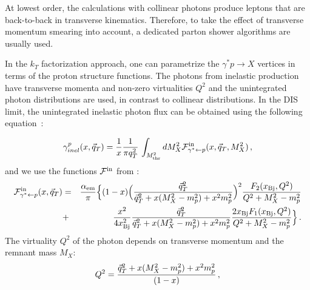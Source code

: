 At lowest order, the calculations with collinear photons  produce leptons that are back-to-back in transverse kinematics. 
Therefore, to take the effect of transverse momentum smearing into account, a dedicated parton shower algorithms are usually used.

In the $k_T$ factorization approach, one can parametrize the $\gamma^*p \rightarrow X$ vertices in terms of the proton structure functions. The photons from inelastic production have transverse momenta and non-zero virtualities $Q^2$ and the unintegrated photon distributions are used, in contrast to collinear distributions.
In the DIS limit, the unintegrated inelastic photon flux can be obtained using the following equation~\cite{daSilveira:2014jla, Luszczak:2015aoa}:

\begin{eqnarray}
\gamma^p_{inel}(x,\vec{q}_T) = {1\over x} 
{1 \over \pi q_T^2} \, \int_{M^2_{\rm thr}} dM_X^2 {\cal{F}}^{\mathrm{in}}_{\gamma^* \leftarrow p} (x,\vec{q}_T,M^2_X) \, ,
\end{eqnarray}
and we use the functions $ {\cal{F}}^{\mathrm{in}}$ from \cite{Budnev,WWpaper}:
\begin{eqnarray}
{\cal{F}}^{\mathrm{in}}_{\gamma^* \leftarrow p} (x,\vec{q}_T) &=& {\alpha_{\rm em} \over \pi} 
\Big\{(1-x) \Big( {\vec{q}_T^2 \over \vec{q}_T^2 + x (M_X^2 - m_p^2) + x^2 m_p^2  }\Big)^2  
{F_2(x_{\rm Bj},Q^2) \over Q^2 + M_X^2 - m_p^2}  \nonumber \\
&+& {x^2 \over 4 x^2_{\rm Bj}}  
{\vec{q}_T^2 \over \vec{q}_T^2 + x (M_X^2 - m_p^2) + x^2 m_p^2  }
{2 x_{\rm Bj} F_1(x_{\rm Bj},Q^2) \over Q^2 + M_X^2 - m_p^2} \Big\} \, .
\end{eqnarray}
The virtuality $Q^2$ of the photon depends on transverse momentum and the remnant mass $M_X$:
\begin{eqnarray}
Q^2 =  {\vec{q}_T^2 + x (M_X^2 - m_p^2) + x^2 m_p^2 \over (1-x)} \, ,
\end{eqnarray}

